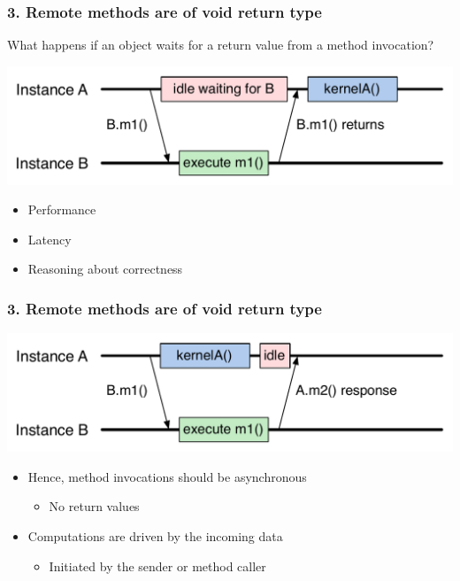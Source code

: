 \begin{frame}
\frametitle{3. Remote methods are of void return type}
  What happens if an object waits for a return value from a method invocation?
  \pause
  \begin{center}
    \includegraphics[width=\textwidth]{../figures/objectSequence.pdf}
  \end{center}
  \pause
  \begin{itemize}
    \item Performance
    \item Latency
    \item Reasoning about correctness
  \end{itemize}
\end{frame}


\begin{frame}
\frametitle{3. Remote methods are of void return type}
  \begin{center}
    \includegraphics[width=\textwidth]{../figures/objectSequenceAsync.pdf}
  \end{center}
  \begin{itemize}
  \item Hence, method invocations should be asynchronous
    \begin{itemize}
    \item No return values
    \end{itemize}
  \item Computations are driven by the incoming data
    \begin{itemize}
    \item Initiated by the sender or method caller
    \end{itemize}
  \end{itemize}
\end{frame}



